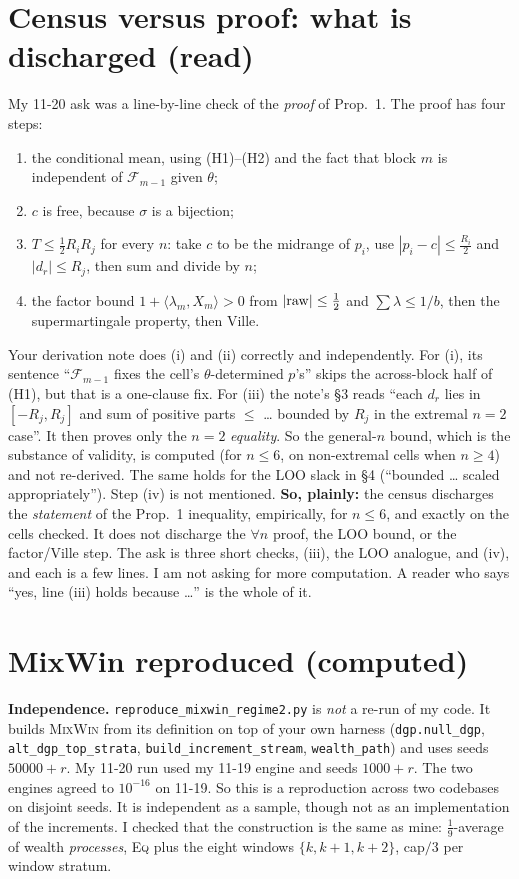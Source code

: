 \documentclass[11pt]{article}
\newcommand{\Fc}{\mathcal{F}}
\begin{document}
\section{Census versus proof: what is discharged (read)}\label{sec:proof}
My 11-20 ask was a line-by-line check of the \emph{proof} of Prop.~1. The proof has four steps:
\begin{enumerate}[nosep,label=(\roman*)]
\item the conditional mean, using (H1)--(H2) and the fact that block $m$ is independent of $\Fc_{m-1}$ given $\theta$;
\item $c$ is free, because $\sigma$ is a bijection;
\item $T\le\frac12R_iR_j$ for every $n$: take $c$ to be the midrange of $p_i$, use $|p_i-c|\le\frac{R_i}2$ and $|d_r|\le R_j$, then sum and divide by $n$;
\item the factor bound $1+\langle\lambda_m,X_m\rangle>0$ from $|{\rm raw}|\le\frac12$ and $\sum\lambda\le1/b$, then the supermartingale property, then Ville.
\end{enumerate}
Your derivation note does (i) and (ii) correctly and independently. For (i), its sentence ``$\Fc_{m-1}$ fixes the cell's $\theta$-determined $p$'s'' skips the across-block half of (H1), but that is a one-clause fix.
For (iii) the note's \S3 reads ``each $d_r$ lies in $[-R_j,R_j]$ and sum of positive parts $\le$ \dots{} bounded by $R_j$ in the extremal $n=2$ case''. It then proves only the $n=2$ \emph{equality}.
So the general-$n$ bound, which is the substance of validity, is computed (for $n\le6$, on non-extremal cells when $n\ge4$) and not re-derived. The same holds for the LOO slack in \S4 (``bounded \dots{} scaled appropriately'').
Step (iv) is not mentioned.
\textbf{So, plainly:} the census discharges the \emph{statement} of the Prop.~1 inequality, empirically, for $n\le6$, and exactly on the cells checked. It does not discharge the $\forall n$ proof, the LOO bound, or the factor/Ville step. The ask is three short checks, (iii), the LOO analogue, and (iv), and each is a few lines.
I am not asking for more computation. A reader who says ``yes, line (iii) holds because \dots'' is the whole of it.

\section{MixWin reproduced (computed)}\label{sec:mixwin}
\textbf{Independence.} \texttt{reproduce\_mixwin\_regime2.py} is \emph{not} a re-run of my code. It builds \textsc{MixWin} from its definition on top of your own harness (\texttt{dgp.null\_dgp}, \texttt{alt\_dgp\_top\_strata}, \texttt{build\_increment\_stream}, \texttt{wealth\_path}) and uses seeds $50000+r$. My 11-20 run used my 11-19 engine and seeds $1000+r$.
The two engines agreed to $10^{-16}$ on 11-19. So this is a reproduction across two codebases on disjoint seeds. It is independent as a sample, though not as an implementation of the increments. I checked that the construction is the same as mine: $\frac19$-average of wealth \emph{processes}, \textsc{Eq} plus the eight windows $\{k,k+1,k+2\}$, cap$/3$ per window stratum.
\end{document}

